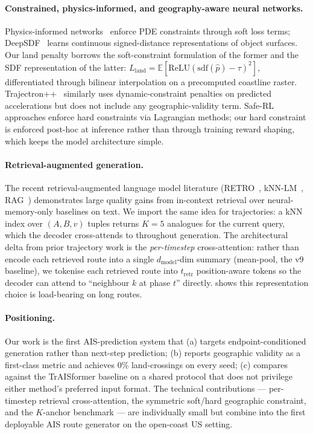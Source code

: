 \documentclass[11pt]{article}
\begin{document}
\paragraph{Constrained, physics-informed, and geography-aware neural
networks.} Physics-informed networks~\citep{pinn2019} enforce
PDE constraints through soft loss terms; DeepSDF~\citep{deepsdf2019}
learns continuous signed-distance representations of object surfaces.
Our land penalty borrows the soft-constraint formulation of the
former and the SDF representation of the latter:
$L_{\text{land}} = \mathbb{E}[\mathrm{ReLU}(\mathrm{sdf}(\hat p) - \tau)^2]$,
differentiated through bilinear interpolation on a precomputed coastline
raster. Trajectron++~\citep{trajectronpp2020} similarly uses
dynamic-constraint penalties on predicted accelerations but does not
include any geographic-validity term. Safe-RL approaches enforce hard
constraints via Lagrangian methods; our hard constraint is enforced
post-hoc at inference rather than through training reward shaping,
which keeps the model architecture simple.

\paragraph{Retrieval-augmented generation.}
The recent retrieval-augmented language model literature
(RETRO~\citep{retro2022}, kNN-LM~\citep{knnlm2020},
RAG~\citep{rag2020}) demonstrates large quality gains from
in-context retrieval over neural-memory-only baselines on text. We
import the same idea for trajectories: a kNN index over
$(A, B, v)$ tuples returns $K=5$ analogues for the current query,
which the decoder cross-attends to throughout generation. The
architectural delta from prior trajectory work is the
\emph{per-timestep} cross-attention: rather than encode each retrieved
route into a single $d_{\text{model}}$-dim summary
(mean-pool, the v9 baseline), we tokenise each retrieved route into $t_{\text{retr}}$
position-aware tokens so the decoder can attend to ``neighbour $k$ at
phase $t$'' directly.  shows this representation
choice is load-bearing on long routes.

\paragraph{Positioning.}
Our work is the first AIS-prediction system that (a) targets
endpoint-conditioned generation rather than next-step prediction;
(b) reports geographic validity as a first-class metric and achieves
$0$\% land-crossings on every seed; (c) compares against the
TrAISformer baseline on a shared protocol that does not privilege
either method's preferred input format. The technical contributions
--- per-timestep retrieval cross-attention, the symmetric soft/hard
geographic constraint, and the $K$-anchor benchmark --- are
individually small but combine into the first deployable AIS route
generator on the open-coast US setting.
\end{document}
